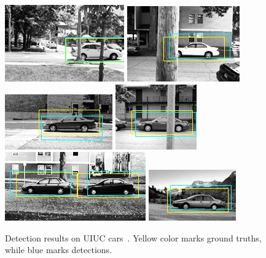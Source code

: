 \begin{figure}
\includegraphics[scale=0.75]{test-24_good.jpg}
\includegraphics[scale=0.75]{test-29_good.jpg}
\includegraphics[scale=0.75]{test-2_good.jpg}
\includegraphics[scale=0.75]{test-31_good.jpg}
\includegraphics[scale=0.75]{test-3_good.jpg}
\includegraphics[scale=0.75]{test-5_good.jpg}


\caption[Detection Results on UIUC cars]{Detection results on UIUC cars~\cite{cds}. Yellow color marks ground truths, while blue marks detections.}
\label{fig:c5r}
\end{figure}

